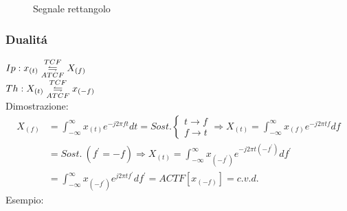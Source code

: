 {\begin{figure}[H]
                        \caption{Segnale rettangolo}
                        \label{fig:es linearita}
                    \end{figure}                    
                }
                

        \subsubsection{Dualitá}\label{Dualita}
            $Ip: x_{(t)} \overunderset{TCF}{ATCF}{\leftrightharpoons} X_{(f)}$\\        
            $Th: X_{(t)} \overunderset{TCF}{ATCF}{\leftrightharpoons} x_{(-f)}$ \\
            Dimostrazione:
            \begin{align}
                X_{(f)} & = \int_{-\infty}^{\infty} x_{(t)} e^{-j2\pi ft} dt = Sost. \begin{cases}
                    t \rightarrow f\\
                    f \rightarrow t
                \end{cases} \Rightarrow  X_{(t)} = \int_{-\infty}^{\infty} x_{(f)} e^{-j2\pi tf} df \nonumber \\
                        & =Sost.\ (f^\prime = -f) \Rightarrow  X_{(t)} = \int_{-\infty}^{\infty} x_{(-f^\prime)} e^{-j2\pi t(-f^\prime)} df^\prime\nonumber \\
                        & =\int_{-\infty}^{\infty} x_{(-f^\prime)} e^{j2\pi tf^\prime} df^\prime= ACTF[x_{(-f)}] = c.v.d.  \nonumber
            \end{align}
            Esempio:\\
